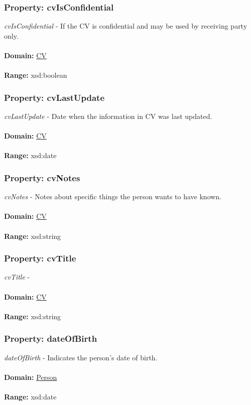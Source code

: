 \documentclass[a4paper,12pt]{article}
\numberwithin{equation}{section}
\begin{document}
\subsubsection{Property: cvIsConfidential}\hypertarget{cvIsConfidential}{}
\textit{cvIsConfidential} - If the CV is confidential and may be used by receiving party only.
\\\\
\textbf{Domain:} \hyperlink{CV}{CV} 
\\\\
\textbf{Range:}  xsd:boolean

\subsubsection{Property: cvLastUpdate}\hypertarget{cvLastUpdate}{}
\textit{cvLastUpdate} - Date when the information in CV was last updated.
\\\\
\textbf{Domain:} \hyperlink{CV}{CV} 
\\\\
\textbf{Range:}  xsd:date

\subsubsection{Property: cvNotes}\hypertarget{cvNotes}{}
\textit{cvNotes} - Notes about specific things the person wants to have known.
\\\\
\textbf{Domain:} \hyperlink{CV}{CV} 
\\\\
\textbf{Range:}  xsd:string

\subsubsection{Property: cvTitle}\hypertarget{cvTitle}{}
\textit{cvTitle} -
\\\\
\textbf{Domain:} \hyperlink{CV}{CV} 
\\\\
\textbf{Range:}  xsd:string

\subsubsection{Property: dateOfBirth}\hypertarget{dateOfBirth}{}
\textit{dateOfBirth} - Indicates the person's date of birth.
\\\\
\textbf{Domain:} \hyperlink{Person}{Person} 
\\\\
\textbf{Range:}  xsd:date
\end{document}
